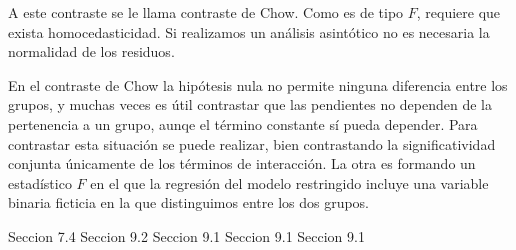 A este contraste se le llama contraste de Chow. Como es de tipo $F$, requiere que exista homocedasticidad. Si realizamos un an\'alisis asint\'otico no es necesaria la normalidad de los residuos.

En el contraste de Chow la hip\'otesis nula no permite ninguna diferencia entre los grupos, y muchas veces es \'util contrastar que las pendientes no dependen de la pertenencia a un grupo, aunqe el t\'ermino constante s\'i pueda depender. Para contrastar esta situaci\'on se puede realizar, bien contrastando la significatividad conjunta \'unicamente de los t\'erminos de interacci\'on. La otra es formando un estad\'istico $F$ en el que la regresi\'on del modelo restringido incluye una variable binaria ficticia en la que distinguimos entre los dos grupos.


Seccion 7.4
Seccion 9.2
Seccion 9.1
Seccion 9.1
Seccion 9.1